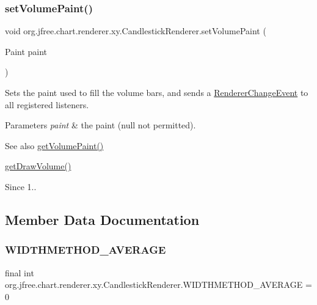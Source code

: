 \subsubsection{\texorpdfstring{set\+Volume\+Paint()}{setVolumePaint()}}
{\footnotesize\ttfamily void org.\+jfree.\+chart.\+renderer.\+xy.\+Candlestick\+Renderer.\+set\+Volume\+Paint (\begin{DoxyParamCaption}\item[{Paint}]{paint }\end{DoxyParamCaption})}

Sets the paint used to fill the volume bars, and sends a \mbox{\hyperlink{}{Renderer\+Change\+Event}} to all registered listeners.


\begin{DoxyParams}{Parameters}
{\em paint} & the paint ({\ttfamily null} not permitted).\\
\hline
\end{DoxyParams}
\begin{DoxySeeAlso}{See also}
\mbox{\hyperlink{classorg_1_1jfree_1_1chart_1_1renderer_1_1xy_1_1_candlestick_renderer_aceacdf4786ea906e937154c46474e117}{get\+Volume\+Paint()}} 

\mbox{\hyperlink{classorg_1_1jfree_1_1chart_1_1renderer_1_1xy_1_1_candlestick_renderer_a031b1f856f7ef71b3ec51e52604c9dfe}{get\+Draw\+Volume()}}
\end{DoxySeeAlso}
\begin{DoxySince}{Since}
1.. 
\end{DoxySince}


\subsection{Member Data Documentation}
\mbox{\label{classorg_1_1jfree_1_1chart_1_1renderer_1_1xy_1_1_candlestick_renderer_a3e96421ed7be8208f8e2e48ade0a21d2}} 
\subsubsection{\texorpdfstring{W\+I\+D\+T\+H\+M\+E\+T\+H\+O\+D\+\_\+\+A\+V\+E\+R\+A\+GE}{WIDTHMETHOD\_AVERAGE}}
{\footnotesize\ttfamily final int org.\+jfree.\+chart.\+renderer.\+xy.\+Candlestick\+Renderer.\+W\+I\+D\+T\+H\+M\+E\+T\+H\+O\+D\+\_\+\+A\+V\+E\+R\+A\+GE = 0\hspace{0.3cm}{\ttfamily [static]}}

